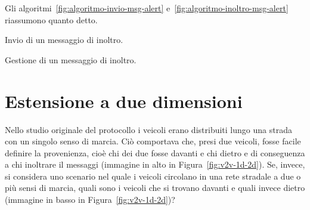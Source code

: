 Gli algoritmi~\ref{fig:algoritmo-invio-msg-alert} e~\ref{fig:algoritmo-inoltro-msg-alert} riassumono quanto detto.
%
\begin{italianalgorithm}[h]
\caption{Invio di un messaggio di inoltro.}\label{fig:algoritmo-invio-msg-alert}
\begin{algorithmic}[1]
\end{algorithmic}
\end{italianalgorithm}
%
\begin{italianalgorithm}[h]
\caption{Gestione di un messaggio di inoltro.}\label{fig:algoritmo-inoltro-msg-alert}
\begin{algorithmic}[1]
	\Else{}
	\EndIf{}
\end{algorithmic}
\end{italianalgorithm}
%
\section{Estensione a due dimensioni}\label{sec:fb-estensione-due-dimensioni}
Nello studio originale del protocollo i veicoli erano distribuiti lungo una strada con un singolo senso di marcia.
Ciò comportava che, presi due veicoli, fosse facile definire la provenienza, cioè chi dei due fosse davanti e chi dietro
e di conseguenza a chi inoltrare il messaggi (immagine in alto in Figura~\ref{fig:v2v-1d-2d}).
Se, invece, si considera uno scenario nel quale i veicoli circolano in una rete stradale a due o più sensi di marcia,
quali sono i veicoli che si trovano davanti e quali invece dietro (immagine in basso in Figura~\ref{fig:v2v-1d-2d})?

